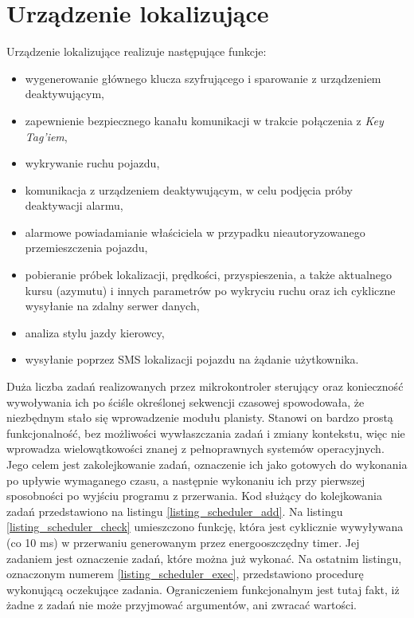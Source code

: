 \section{Urządzenie lokalizujące}
\lstset{language=C}

Urządzenie lokalizujące realizuje następujące funkcje: 

\begin{itemize}
\item wygenerowanie głównego klucza szyfrującego i sparowanie z urządzeniem deaktywującym,
\item zapewnienie bezpiecznego kanału komunikacji w trakcie połączenia z \textit{Key Tag'iem},
\item wykrywanie ruchu pojazdu,
\item komunikacja z urządzeniem deaktywującym, w celu podjęcia próby deaktywacji alarmu,
\item alarmowe powiadamianie właściciela w przypadku nieautoryzowanego przemieszczenia pojazdu,
\item pobieranie próbek lokalizacji, prędkości, przyspieszenia, a  także aktualnego kursu (azymutu) i innych parametrów po wykryciu ruchu oraz ich cykliczne wysyłanie na zdalny serwer danych,
\item analiza stylu jazdy kierowcy,
\item wysyłanie poprzez SMS lokalizacji pojazdu na żądanie użytkownika.
\end{itemize}

\clearpage
Duża liczba zadań realizowanych przez mikrokontroler sterujący oraz konieczność wywoływania ich po ściśle określonej sekwencji czasowej spowodowała, że niezbędnym stało się wprowadzenie modułu planisty. Stanowi on bardzo prostą funkcjonalność, bez możliwości wywłaszczania zadań i zmiany kontekstu, więc nie wprowadza wielowątkowości znanej z pełnoprawnych systemów operacyjnych. Jego celem jest zakolejkowanie zadań, oznaczenie ich jako gotowych do wykonania po upływie wymaganego czasu, a następnie wykonaniu ich przy pierwszej sposobności po wyjściu programu z przerwania. Kod służący do  kolejkowania zadań przedstawiono na listingu \ref{listing_scheduler_add}. Na listingu \ref{listing_scheduler_check} umieszczono funkcję, która jest cyklicznie wywyływana (co 10 ms) w przerwaniu generowanym przez energooszczędny timer. Jej zadaniem jest oznaczenie zadań, które można już wykonać. Na ostatnim listingu, oznaczonym numerem  \ref{listing_scheduler_exec}, przedstawiono procedurę wykonującą oczekujące zadania. Ograniczeniem funkcjonalnym jest tutaj fakt, iż żadne z zadań nie może przyjmować argumentów, ani zwracać wartości. 
\clearpage

